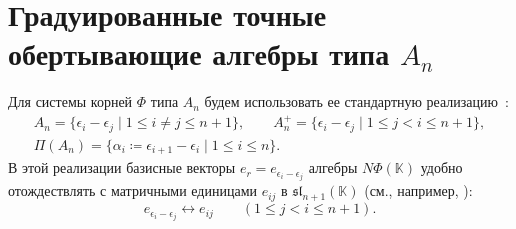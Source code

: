 \documentclass[a4paper,14pt,oneside,openany]{memoir}
\begin{document}
\section{Градуированные точные обертывающие алгебры типа \texorpdfstring{$A_n$}{Aₙ}}\label{sec:graded-An}
%
Для системы корней $\Phi$ типа $A_n$ будем использовать ее стандартную
реализацию~\cite[таблица I]{bourbaki72}:
\begin{equation}\label{eq:An-Root-System}
    \begin{gathered}
        A_n=\{\epsilon_i-\epsilon_j \mid 1\leq i\neq j\leq n+1\},\qquad
        A_n^+=\{\epsilon_i-\epsilon_j \mid 1\leq j<i\leq n+1\},\\
        \Pi(A_n)=\{\alpha_i\coloneq \epsilon_{i+1}-\epsilon_i \mid 1\leq i\leq n\}.
    \end{gathered}
\end{equation}
%
В этой реализации базисные векторы $e_r=e_{\epsilon_i-\epsilon_j}$ алгебры
$N\Phi(\mathbb{K})$ удобно отождествлять с матричными единицами $e_{ij}$ в
$\mathfrak{sl}_{n+1}(\mathbb{K})$ (см., например, \cite[\S~11.2.1]{carter72}):
\begin{equation}\label{eq:An-matrix-realization}
    e_{\epsilon_i-\epsilon_j} \longleftrightarrow e_{ij} \qquad (1 \le j < i \le n+1).
\end{equation}
\end{document}
